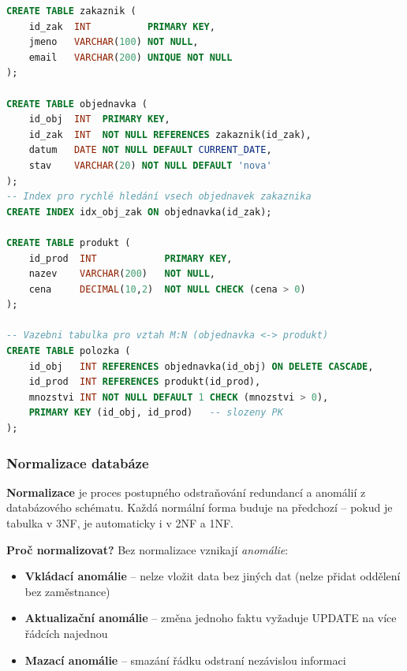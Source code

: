 \begin{lstlisting}[language=SQL, caption=Fyzický model -- CREATE TABLE (PostgreSQL)]
CREATE TABLE zakaznik (
    id_zak  INT          PRIMARY KEY,
    jmeno   VARCHAR(100) NOT NULL,
    email   VARCHAR(200) UNIQUE NOT NULL
);

CREATE TABLE objednavka (
    id_obj  INT  PRIMARY KEY,
    id_zak  INT  NOT NULL REFERENCES zakaznik(id_zak),
    datum   DATE NOT NULL DEFAULT CURRENT_DATE,
    stav    VARCHAR(20) NOT NULL DEFAULT 'nova'
);
-- Index pro rychlé hledání vsech objednavek zakaznika
CREATE INDEX idx_obj_zak ON objednavka(id_zak);

CREATE TABLE produkt (
    id_prod  INT            PRIMARY KEY,
    nazev    VARCHAR(200)   NOT NULL,
    cena     DECIMAL(10,2)  NOT NULL CHECK (cena > 0)
);

-- Vazebni tabulka pro vztah M:N (objednavka <-> produkt)
CREATE TABLE polozka (
    id_obj   INT REFERENCES objednavka(id_obj) ON DELETE CASCADE,
    id_prod  INT REFERENCES produkt(id_prod),
    mnozstvi INT NOT NULL DEFAULT 1 CHECK (mnozstvi > 0),
    PRIMARY KEY (id_obj, id_prod)   -- slozeny PK
);
\end{lstlisting}

\subsubsection{Normalizace databáze}

\textbf{Normalizace} je proces postupného odstraňování redundancí a anomálií z databázového schématu.
Každá normální forma buduje na předchozí -- pokud je tabulka v 3NF, je automaticky i v 2NF a 1NF.

\textbf{Proč normalizovat?} Bez normalizace vznikají \textit{anomálie}:
\begin{itemize}
  \item \textbf{Vkládací anomálie} -- nelze vložit data bez jiných dat (nelze přidat oddělení bez zaměstnance)
  \item \textbf{Aktualizační anomálie} -- změna jednoho faktu vyžaduje UPDATE na více řádcích najednou
  \item \textbf{Mazací anomálie} -- smazání řádku odstraní nezávislou informaci
\end{itemize}

